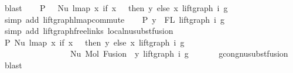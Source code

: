 \begin{isabellebody}
\ blast\isanewline
\ \ \isamarkupfalse%
\ P{}{\isacharcolon}{\kern0pt}\ {\isachardoublequoteopen}{\isachardot}{\kern0pt}{\isachardot}{\kern0pt}{\isachardot}{\kern0pt}\ {\isacharequal}{\kern0pt}\ Nu\ {\isacharparenleft}{\kern0pt}lmap\ {\isacharparenleft}{\kern0pt}{\isasymlambda}x{\isachardot}{\kern0pt}\ if\ x\ {\isacharequal}{\kern0pt}\ {}\ then\ y\ else\ x{\isacharparenright}{\kern0pt}\ {\isacharparenleft}{\kern0pt}lift{\isacharunderscore}{\kern0pt}graph\ i\ g{\isacharparenright}{\kern0pt}{\isacharparenright}{\kern0pt}{\isachardoublequoteclose}\isanewline
\ \ \ \ \ \ \isamarkupfalse%
\ {\isacharparenleft}{\kern0pt}simp\ add{\isacharcolon}{\kern0pt}\ lift{\isacharunderscore}{\kern0pt}graph{\isacharunderscore}{\kern0pt}lmap{\isacharunderscore}{\kern0pt}commute{\isacharparenright}{\kern0pt}\isanewline
\ \ \isamarkupfalse%
\ P{}{\isacharcolon}{\kern0pt}\ {\isachardoublequoteopen}y\ {\isasymin}\ FL\ {\isacharparenleft}{\kern0pt}lift{\isacharunderscore}{\kern0pt}graph\ i\ g{\isacharparenright}{\kern0pt}{\isachardoublequoteclose}\isanewline
\ \ \ \ \ \isamarkupfalse%
\ {\isacharparenleft}{\kern0pt}simp\ add{\isacharcolon}{\kern0pt}\ lift{\isacharunderscore}{\kern0pt}graph{\isacharunderscore}{\kern0pt}freelinks\ local{\isachardot}{\kern0pt}nu{\isacharunderscore}{\kern0pt}subst{\isacharunderscore}{\kern0pt}fusion{}{\isacharparenright}{\kern0pt}\isanewline
\ \ \isamarkupfalse%
\ \isamarkupfalse%
\ P{}{\isacharcolon}{\kern0pt}\ {\isachardoublequoteopen}Nu\ {\isacharparenleft}{\kern0pt}lmap\ {\isacharparenleft}{\kern0pt}{\isasymlambda}x{\isachardot}{\kern0pt}\ if\ x\ {\isacharequal}{\kern0pt}\ {}\ then\ y\ else\ x{\isacharparenright}{\kern0pt}\ {\isacharparenleft}{\kern0pt}lift{\isacharunderscore}{\kern0pt}graph\ i\ g{\isacharparenright}{\kern0pt}{\isacharparenright}{\kern0pt}\ {\isasymsimeq}\isanewline
\ \ \ \ \ \ \ \ \ \ \ \ \ \ \ \ \ Nu\ {\isacharparenleft}{\kern0pt}Mol\ {\isacharparenleft}{\kern0pt}Fusion\ {}\ y{\isacharparenright}{\kern0pt}\ {\isacharparenleft}{\kern0pt}lift{\isacharunderscore}{\kern0pt}graph\ i\ g{\isacharparenright}{\kern0pt}{\isacharparenright}{\kern0pt}{\isachardoublequoteclose}\isanewline
\ \ \ \ \ \isamarkupfalse%
\ gcong{\isachardot}{\kern0pt}nu{\isacharunderscore}{\kern0pt}subst{\isacharunderscore}{\kern0pt}fusion{}\ \isamarkupfalse%
\ blast\isanewline
\ \ \isamarkupfalse%

\end{isabellebody}
